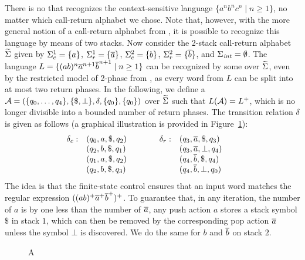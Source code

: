 \documentclass{LMCS}
\begin{document}
\begin{exa}\label{ex:mvpa}
  There is no \MVPA that recognizes the context-sensitive language
  $\{a^nb^nc^n \mid n \ge 1\}$, no matter which call-return alphabet we chose.
  Note that, however, with the more general notion of a call-return alphabet
  from \cite{Murano2007}, it is possible to recognize this language by means
  of two stacks. Now consider the 2-stack call-return alphabet $\widetilde{\Sigma}$
  given by $\Sigma_c^1 = \{ a \}$, $\Sigma_r^1 = \{ {\overline{a}} \}$, $\Sigma_c^2 =
  \{b\}$, $\Sigma_r^2 = \{ {\overline{b}} \}$, and $\Sigma_{\mathit{int}} = \emptyset$. The language
  $L=\{( a b)^n {\overline{a}} ^{n+1} {\overline{b}} ^{n+1} \mid n \ge 1\}$ can be recognized by
  some \tVPA over $\widetilde{\Sigma}$, even by the restricted model of 2-phase \tVPA
  from \cite{Madhusudan2007}, as every word from $L$ can be split into at most
  two return phases. In the following, we define a \tVPA
  $\mathcal{A}=(\{q_0,\ldots,q_4\},\{\$,\bot\},\delta,\{q_0\},\{q_0\})$ over
  $\widetilde{\Sigma}$ such that $L(\mathcal{A}) = L^+$, which is no longer divisible into a
  bounded number of return phases. The transition relation $\delta$ is given
  as follows (a graphical illustration is provided in Figure~\ref{fig:mvpa}):
  \[\hspace{-2em}\begin{array}{rlcrl}
    \cdelta: & (q_0, a ,\$,q_2) & ~~~~~~ & \rdelta: & (q_3, \oa ,\$,q_3) \\
    & (q_2, b,\$,q_1) & & & (q_3, \oa ,\bot,q_4)\\
    & (q_1, a ,\$,q_2) & & & (q_4, \ob ,\$,q_4)\\
    & (q_2, b,\$,q_3) & & & (q_4, \ob ,\bot,q_0)
  \end{array}\]
  The idea is that the finite-state control ensures that an input word matches
  the regular expression $(( a b)^+ {\overline{a}} ^+ {\overline{b}} ^+)^+$. To guarantee that, in
  any iteration, the number of $a$ is by one less than the number of ${\overline{a}}$,
  any push action $a$ stores a stack symbol $\$$ in stack $1$, which can then
  be removed by the corresponding pop action ${\overline{a}}$ unless the symbol $\bot$ is
  discovered. We do the same for $b$ and ${\overline{b}}$ on stack $2$.
\end{exa}

\begin{figure}[h]
  \centering
{}
\caption{A \tVPA \label{fig:mvpa}}
\end{figure}
\end{document}
